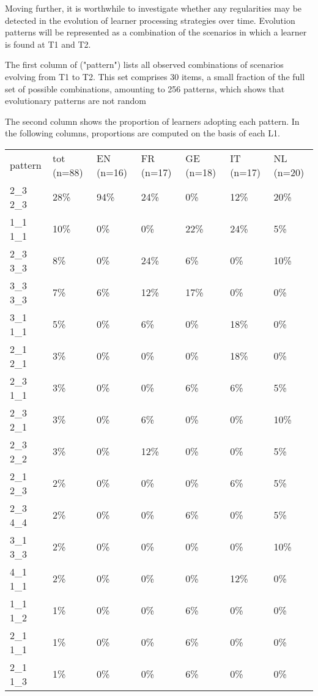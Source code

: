 Moving further, it is worthwhile to investigate whether any regularities may be detected in the evolution of learner processing strategies over time. Evolution patterns will be represented as a combination of the scenarios in which a learner is found at T1 and T2. 

The first column of  ("pattern") lists all observed combinations of scenarios evolving from T1 to T2. This set comprises 30 items, a small fraction of the full set of possible combinations, amounting to 256 patterns, which shows that evolutionary patterns are not random

The second column shows the proportion of learners adopting each pattern. In the following columns, proportions are computed on the basis of each L1.

\begin{table}
    \begin{tabularx}{\textwidth}{XXXXXXX}
        \lsptoprule
        pattern & tot (n=88) & EN (n=16) & FR (n=17) & GE (n=18) & IT (n=17) & NL (n=20)\\
        2\_3 2\_3 & 28\% & 94\% & 24\% & 0\% & 12\% & 20\%\\
        1\_1 1\_1 & 10\% & 0\% & 0\% & 22\% & 24\% & 5\%\\
        2\_3 3\_3 & 8\% & 0\% & 24\% & 6\% & 0\% & 10\%\\
        3\_3 3\_3 & 7\% & 6\% & 12\% & 17\% & 0\% & 0\%\\
        3\_1 1\_1 & 5\% & 0\% & 6\% & 0\% & 18\% & 0\%\\
        2\_1 2\_1 & 3\% & 0\% & 0\% & 0\% & 18\% & 0\%\\
        2\_3 1\_1 & 3\% & 0\% & 0\% & 6\% & 6\% & 5\%\\
        2\_3 2\_1 & 3\% & 0\% & 6\% & 0\% & 0\% & 10\%\\
        2\_3 2\_2 & 3\% & 0\% & 12\% & 0\% & 0\% & 5\%\\
        2\_1 2\_3 & 2\% & 0\% & 0\% & 0\% & 6\% & 5\%\\
        2\_3 4\_4 & 2\% & 0\% & 0\% & 6\% & 0\% & 5\%\\
        3\_1 3\_3 & 2\% & 0\% & 0\% & 0\% & 0\% & 10\%\\
        4\_1 1\_1 & 2\% & 0\% & 0\% & 0\% & 12\% & 0\%\\
        1\_1 1\_2 & 1\% & 0\% & 0\% & 6\% & 0\% & 0\%\\
        2\_1 1\_1 & 1\% & 0\% & 0\% & 6\% & 0\% & 0\%\\
        2\_1 1\_3 & 1\% & 0\% & 0\% & 6\% & 0\% & 0\%\\

\end{tabularx}
\end{table}
